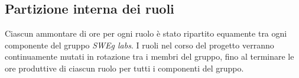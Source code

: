 \subsection{Partizione interna dei ruoli}
Ciascun ammontare di ore per ogni ruolo è stato ripartito equamente tra ogni componente del gruppo \textit{SWEg labs}. I ruoli nel corso del progetto verranno continuamente mutati in rotazione tra i membri del gruppo, fino al terminare le ore produttive di ciascun ruolo per tutti i componenti del gruppo.